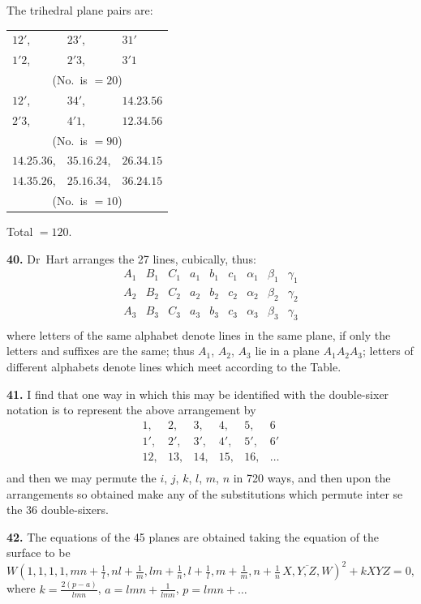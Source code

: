 \documentclass[11pt,a4paper]{article}
\theoremstyle{definition}
\begin{document}
The trihedral plane pairs are:
\begin{center}
\begin{tabular}{lll}
$12'$, & $23'$, & $31'$ \\
$1'2$, & $2'3$, & $3'1$ \\
\multicolumn{3}{c}{(No.\ is $= 20$)} \\
$12'$, & $34'$, & $14.23.56$ \\
$2'3$, & $4'1$, & $12.34.56$ \\
\multicolumn{3}{c}{(No.\ is $= 90$)} \\
$14.25.36$, & $35.16.24$, & $26.34.15$ \\
$14.35.26$, & $25.16.34$, & $36.24.15$ \\
\multicolumn{3}{c}{(No.\ is $= 10$)} \\
\end{tabular}
\end{center}
Total $= 120$.

\textbf{40.} Dr~Hart arranges the 27 lines, cubically, thus:
\[
\begin{array}{ccc|ccc|ccc}
A_1 & B_1 & C_1 & a_1 & b_1 & c_1 & \alpha_1 & \beta_1 & \gamma_1 \\
A_2 & B_2 & C_2 & a_2 & b_2 & c_2 & \alpha_2 & \beta_2 & \gamma_2 \\
A_3 & B_3 & C_3 & a_3 & b_3 & c_3 & \alpha_3 & \beta_3 & \gamma_3 \\
\end{array}
\]
where letters of the same alphabet denote lines in the same plane, if only the letters and suffixes are the same; thus $A_1$, $A_2$, $A_3$ lie in a plane $A_1A_2A_3$; letters of different alphabets denote lines which meet according to the Table.

\textbf{41.} I find that one way in which this may be identified with the double-sixer notation is to represent the above arrangement by
\[
\begin{array}{cccccc}
1, & 2, & 3, & 4, & 5, & 6 \\
1', & 2', & 3', & 4', & 5', & 6' \\
12, & 13, & 14, & 15, & 16, & \ldots \\
\end{array}
\]
and then we may permute the $i$, $j$, $k$, $l$, $m$, $n$ in 720 ways, and then upon the arrangements so obtained make any of the substitutions which permute inter se the 36 double-sixers.

\textbf{42.} The equations of the 45 planes are obtained taking the equation of the surface to be
\[
W(1, 1, 1, 1, mn + \tfrac{1}{l}, nl + \tfrac{1}{m}, lm + \tfrac{1}{n}, l + \tfrac{1}{l}, m + \tfrac{1}{m}, n + \tfrac{1}{n} \,\overline{\!\!X, Y, Z, W\!\!})^2 + kXYZ = 0,
\]
where $k = \tfrac{2(p - a)}{lmn}$, $a = lmn + \tfrac{1}{lmn}$, $p = lmn + \ldots$
\end{document}
